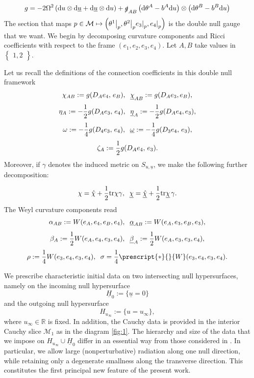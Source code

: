 \documentclass{amsart}
\newcommand{\Hbar}{\underline{H}}
\newcommand{\hsp}{\hspace{.5mm}}
\newcommand{\omegabar}{\underline{\omega}}
\newcommand{\gslash}{\slashed{g}}
\newcommand{\chihat}{\hat{\chi}}
\newcommand{\chibar}{\underline{\chi}}
\newcommand{\chibarhat}{\underline{\hat{\chi}}}
\newcommand{\ubar}{\underline{u}}
\newcommand{\be}{\begin{equation}}
\newcommand{\ee}{\end{equation}}
\newcommand{\alphabar}{\underline{\alpha}}
\newcommand{\betabar}{\underline{\beta}}
\newcommand{\etabar}{\underline{\eta}}
\newcommand{\Hodge}[1]{\prescript{*}{}{#1}}
\newcommand{\tr}{\mbox{tr}}
\newcommand\restri[2]{{%
		\left.\kern-\nulldelimiterspace %
		#1 %
		\right|_{#2} %
}}
\begin{document}
\be g= -2\Omega^2 \left(\text{d}u \otimes \text{d}\ubar + \text{d}\ubar \otimes \text{d}u \right) + \gslash_{AB} \left(\text{d}\theta^A - b^A \text{d}u\right)\otimes\left(\text{d}\theta^B- b^B \text{d}u\right)  \ee The section that maps $p\in \mathcal{M} \mapsto \left(\restri{\theta^1}{p},\restri{\theta^2}{p} \restri{e_3}{p}, \restri{e_4}{p}\right)$ is the double null gauge that we want. We begin by decomposing curvature components and Ricci coefficients with respect to the frame $(e_1, e_2,e_3,e_4)$. 
    Let $A, B$ take values in $\begin{Bmatrix} 1,2 \end{Bmatrix}$.

\medskip\noindent Let us recall the definitions of the connection coefficients in this double null framework   \[  \chi_{AB} := g(D_A e_4, \hsp e_B), \hspace{2mm} \chibar_{AB} := g(D_A e_3, e_B),            \] \[   \eta _A := -\frac{1}{2} g(D_A e_3 , \hsp e_4), \hspace{2mm} \etabar_A := -\frac{1}{2} g(D_A e_4, e_3), \]\[  \omega := -\frac{1}{4} g(D_4 e_3 ,\hsp e_4),  \hspace{2mm} \omegabar := -\frac{1}{4} g(D_3 e_4, \hsp e_3),                \]\[ \zeta_A := \frac{1}{2} g(D_A e_4, \hsp e_3).  \]Moreover, if $\gamma$ denotes the induced metric on $S_{u,\ubar}$, we make the following further decomposition:

    \[ \chi = \chihat + \frac{1}{2} \tr\chi  \gamma, \hspace{2mm} \chibar = \chibarhat + \frac{1}{2} \tr\chibar \hsp \gamma.    \]
The Weyl curvature components read
 \[ \alpha_{AB} := W(e_A, e_4, e_B, e_4), \hspace{2mm} \alphabar_{AB}:= W(e_A, e_3, e_B, e_3),       \] \[ \beta_A := \frac{1}{2} W(e_A, e_4 , e_3 ,e_4), \hspace{2mm} \betabar_A := \frac{1}{2} W(e_A, e_3, e_3, e_4),     \] \[  \rho := \frac{1}{4} W(e_3, e_4, e_3, e_4), \hspace{2mm} \sigma  = \frac{1}{4} \Hodge{W}(e_3, e_4, e_3 ,e_4).      \]



\noindent We prescribe characteristic initial data on two intersecting null hypersurfaces, namely on the incoming null hypersurface
\[
\Hbar_{0} := \{ \ubar = 0 \}
\]
and the outgoing null hypersurface
\[
H_{u_\infty} := \{ u = u_\infty \},
\]
where $u_\infty \in \mathbb{R}$ is fixed. In addition, the Cauchy data is provided in the interior Cauchy slice $\mathcal{M}_{1}$ as in the diagram \ref{fig:1}.
The hierarchy and size of the data that we impose on $H_{u_\infty} \cup \Hbar_{0}$ differ in an essential way 
from those considered in \cite{A19,An,AL17,NMY1,NMY2}. 
In particular, we allow large (nonperturbative) radiation along one null direction, 
while retaining only a degenerate smallness along the transverse direction. 
This constitutes the first principal new feature of the present work.
\end{document}
